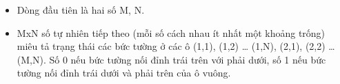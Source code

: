 \begin{itemize}
	\item Dòng đầu tiên là hai số M, N.
	\item MxN số tự nhiên tiếp theo (mỗi số cách nhau ít nhất một khoảng trống) miêu tả trạng thái các bức tường ở các ô (1,1), (1,2) … (1,N), (2,1), (2,2) … (M,N). Số 0 nếu bức tường nối đỉnh trái trên với phải dưới, số 1 nếu bức tường nối đỉnh trái dưới và phải trên của ô vuông.
\end{itemize}